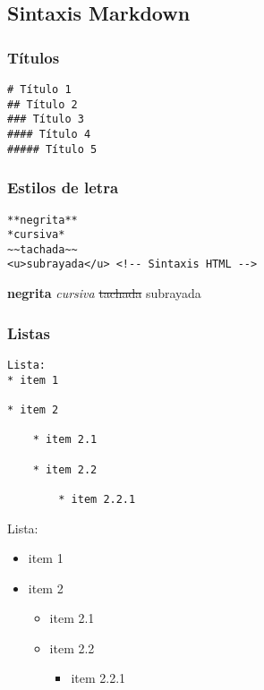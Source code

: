 \documentclass[
]{article}
\providecommand{\tightlist}{%
  \setlength{\itemsep}{0pt}\setlength{\parskip}{0pt}}
\begin{document}
\subsection{Sintaxis Markdown}\label{sintaxis-markdown}

\subsubsection{Títulos}\label{tuxedtulos}

\begin{verbatim}
# Título 1
## Título 2
### Título 3
#### Título 4
##### Título 5
\end{verbatim}

\subsubsection{Estilos de letra}\label{estilos-de-letra}

\begin{verbatim}
**negrita**
*cursiva*
~~tachada~~
<u>subrayada</u> <!-- Sintaxis HTML -->
\end{verbatim}

\textbf{negrita} \emph{cursiva} \st{tachada} subrayada

\subsubsection{Listas}\label{listas}

\begin{verbatim}
Lista:
* item 1

* item 2

    * item 2.1

    * item 2.2

        * item 2.2.1
\end{verbatim}

Lista:

\begin{itemize}
\item
  item 1
\item
  item 2

  \begin{itemize}
  \item
    item 2.1
  \item
    item 2.2

    \begin{itemize}
    \tightlist
    \item
      item 2.2.1
    \end{itemize}
  \end{itemize}
\end{itemize}
\end{document}
